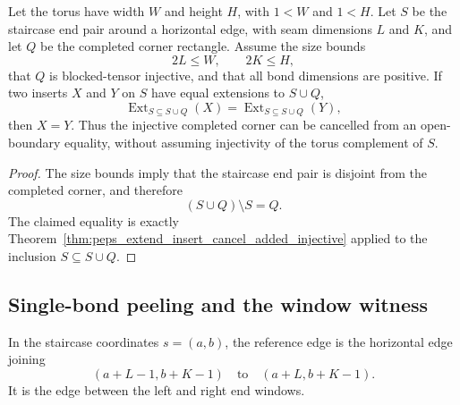 \begin{theorem}
    \label{thm:peps_staircase_pair_cancel}
    \leanok
    Let the torus have width $W$ and height $H$, with $1<W$ and $1<H$.
    Let $S$ be the staircase end pair around a horizontal edge, with seam
    dimensions $L$ and $K$, and let $Q$ be the completed corner rectangle.
    Assume the size bounds
    \[
        2L\le W,\qquad 2K\le H,
    \]
    that $Q$ is blocked-tensor injective, and that all bond dimensions are
    positive.
    If two inserts $X$ and $Y$ on $S$ have equal extensions to $S\cup Q$,
    \[
        \operatorname{Ext}_{S\subseteq S\cup Q}(X)
        =
        \operatorname{Ext}_{S\subseteq S\cup Q}(Y),
    \]
    then $X=Y$.  Thus the injective completed corner can be cancelled from an
    open-boundary equality, without assuming injectivity of the torus
    complement of $S$.
\end{theorem}
\begin{proof}
    \leanok
    The size bounds imply that the staircase end pair is disjoint from the
    completed corner, and therefore
    \[
        (S\cup Q)\setminus S=Q.
    \]
    The claimed equality is exactly
    Theorem~\ref{thm:peps_extend_insert_cancel_added_injective} applied to the
    inclusion $S\subseteq S\cup Q$.
\end{proof}

\subsection{Single-bond peeling and the window witness}
\label{subsec:peps_torus_single_bond_peeling_window_witness}

\begin{definition}
    \label{def:peps_horizontal_staircase_reference_edge}
    \leanok
    In the staircase coordinates $s=(a,b)$, the reference edge is the
    horizontal edge joining
    \[
        (a+L-1,b+K-1)
        \quad\text{to}\quad
        (a+L,b+K-1).
    \]
    It is the edge between the left and right end windows.
\end{definition}

